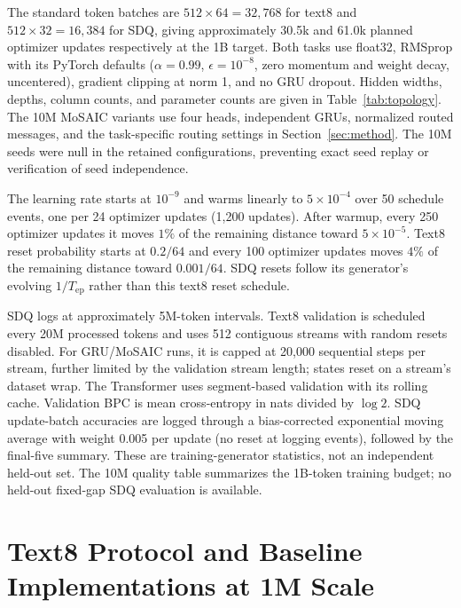 \documentclass[letterpaper,twoside]{article}
\begin{document}
The standard token batches are $512\times64=32{,}768$ for text8 and $512\times32=16{,}384$ for SDQ, giving approximately 30.5k and 61.0k planned optimizer updates respectively at the 1B target. Both tasks use float32, RMSprop with its PyTorch defaults ($\alpha=0.99$, $\epsilon=10^{-8}$, zero momentum and weight decay, uncentered), gradient clipping at norm 1, and no GRU dropout. Hidden widths, depths, column counts, and parameter counts are given in Table~\ref{tab:topology}. The 10M MoSAIC variants use four heads, independent GRUs, normalized routed messages, and the task-specific routing settings in Section~\ref{sec:method}. The 10M seeds were null in the retained configurations, preventing exact seed replay or verification of seed independence.

The learning rate starts at $10^{-9}$ and warms linearly to $5\times10^{-4}$ over 50 schedule events, one per 24 optimizer updates (1,200 updates). After warmup, every 250 optimizer updates it moves $1\%$ of the remaining distance toward $5\times10^{-5}$. Text8 reset probability starts at $0.2/64$ and every 100 optimizer updates moves $4\%$ of the remaining distance toward $0.001/64$. SDQ resets follow its generator's evolving $1/T_{\mathrm{ep}}$ rather than this text8 reset schedule.

SDQ logs at approximately 5M-token intervals. Text8 validation is scheduled every 20M processed tokens and uses 512 contiguous streams with random resets disabled. For GRU/MoSAIC runs, it is capped at 20,000 sequential steps per stream, further limited by the validation stream length; states reset on a stream's dataset wrap. The Transformer uses segment-based validation with its rolling cache. Validation BPC is mean cross-entropy in nats divided by $\log 2$. SDQ update-batch accuracies are logged through a bias-corrected exponential moving average with weight 0.005 per update (no reset at logging events), followed by the final-five summary. These are training-generator statistics, not an independent held-out set. The 10M quality table summarizes the 1B-token training budget; no held-out fixed-gap SDQ evaluation is available.


\section{Text8 Protocol and Baseline Implementations at 1M Scale}\label{app:midprotocol}
\end{document}
